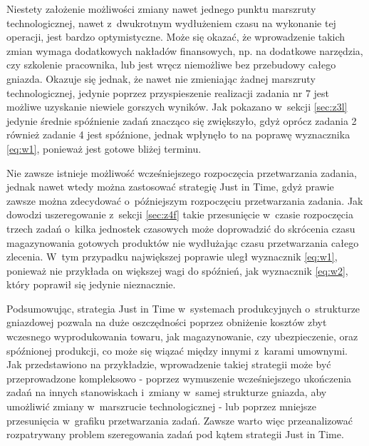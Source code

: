 \documentclass[twoside]{kInzynierka}
\begin{document}
Niestety założenie możliwości zmiany nawet jednego punktu marszruty technologicznej, nawet z~dwukrotnym wydłużeniem czasu na wykonanie tej operacji, jest bardzo optymistyczne. Może się okazać, że wprowadzenie takich zmian wymaga dodatkowych nakładów finansowych, np. na dodatkowe narzędzia, czy szkolenie pracownika, lub jest wręcz niemożliwe bez przebudowy całego gniazda. Okazuje się jednak, że nawet nie zmieniając żadnej marszruty technologicznej, jedynie poprzez przyspieszenie realizacji zadania nr 7 jest możliwe uzyskanie niewiele gorszych wyników. Jak pokazano w~sekcji \ref{sec:z3l} jedynie średnie spóźnienie zadań znacząco się zwiększyło, gdyż oprócz zadania 2 również zadanie 4 jest spóźnione, jednak wpłynęło to na poprawę wyznacznika \eqref{eq:w1}, ponieważ jest gotowe bliżej terminu.

Nie zawsze istnieje możliwość wcześniejszego rozpoczęcia przetwarzania zadania, jednak nawet wtedy można zastosować strategię Just in Time, gdyż prawie zawsze można zdecydować o~późniejszym rozpoczęciu przetwarzania zadania. Jak dowodzi uszeregowanie z~sekcji \ref{sec:z4f} takie przesunięcie w~czasie rozpoczęcia trzech zadań o~kilka jednostek czasowych może doprowadzić do skrócenia czasu magazynowania gotowych produktów nie wydłużając czasu przetwarzania całego zlecenia. W~tym przypadku największej poprawie uległ wyznacznik \eqref{eq:w1}, ponieważ nie przykłada on większej wagi do spóźnień, jak wyznacznik \eqref{eq:w2}, który poprawił się jedynie nieznacznie.

Podsumowując, strategia Just in Time w~systemach produkcyjnych o~strukturze gniazdowej pozwala na duże oszczędności poprzez obniżenie kosztów zbyt wczesnego wyprodukowania towaru, jak magazynowanie, czy ubezpieczenie, oraz spóźnionej produkcji, co może się wiązać między innymi z~karami umownymi. Jak przedstawiono na przykładzie, wprowadzenie takiej strategii może być przeprowadzone kompleksowo - poprzez wymuszenie wcześniejszego ukończenia zadań na innych stanowiskach i~zmiany w~samej strukturze gniazda, aby umożliwić zmiany w~marszrucie technologicznej - lub poprzez mniejsze przesunięcia w~grafiku przetwarzania zadań. Zawsze warto więc przeanalizować rozpatrywany problem szeregowania zadań pod kątem strategii Just in Time.
\end{document}
